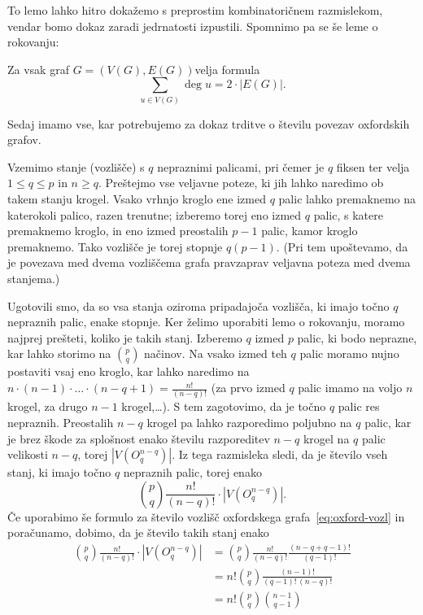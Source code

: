 \documentclass[twoside,11pt]{article}
\newcommand{\graf}[1][G]{\ensuremath{#1 = (V(#1), E(#1))}}
\DeclareMathOperator {\stopnja} {deg}
\begin{document}
To lemo lahko hitro dokažemo s preprostim kombinatoričnem razmislekom, vendar bomo dokaz zaradi jedrnatosti izpustili. Spomnimo pa se še leme o rokovanju:
\begin{lema}
    \label{lema:rokovanje}
    Za vsak graf \graf velja formula
    \begin{equation}
    \sum_{u \in V(G)}\! \stopnja u = 2 \cdot |E(G)|.
    \label{eq:lema-o-rokovanju}
    \end{equation}
\end{lema}

Sedaj imamo vse, kar potrebujemo za dokaz trditve o številu povezav oxfordskih grafov.

\begin{dokaz}
Vzemimo stanje (vozlišče) s $q$ nepraznimi palicami, pri čemer je $q$ fiksen ter velja $1 \leq q \leq p$ in $n \geq q$. Preštejmo vse veljavne poteze, ki jih lahko naredimo ob takem stanju krogel. Vsako vrhnjo kroglo ene izmed $q$ palic lahko premaknemo na katerokoli palico, razen trenutne; izberemo torej eno izmed $q$ palic, s katere premaknemo kroglo, in eno izmed preostalih $p-1$ palic, kamor kroglo premaknemo. Tako vozlišče je torej stopnje $q(p-1)$. (Pri tem upoštevamo, da je povezava med dvema vozliščema grafa pravzaprav veljavna poteza med dvema stanjema.)

Ugotovili smo, da so vsa stanja oziroma pripadajoča vozlišča, ki imajo točno $q$ nepraznih palic, enake stopnje. Ker želimo uporabiti lemo o rokovanju, moramo najprej prešteti, koliko je takih stanj. 
Izberemo $q$ izmed $p$ palic, ki bodo neprazne, kar lahko storimo na ${p \choose q}$ načinov. Na vsako izmed teh $q$ palic moramo nujno postaviti vsaj eno kroglo, kar lahko naredimo na $n \cdot (n-1) \cdot \ldots \cdot (n-q+1) = \frac{n!}{(n-q)!}$ (za prvo izmed $q$ palic imamo na voljo $n$ krogel, za drugo $n-1$ krogel,\ldots). S tem zagotovimo, da je točno $q$ palic res nepraznih. Preostalih $n-q$ krogel pa lahko razporedimo poljubno na $q$ palic, kar je brez škode za splošnost enako številu razporeditev $n-q$ krogel na $q$ palic velikosti $n-q$, torej $|V(O^{n-q}_q)|$.
Iz tega razmisleka sledi, da je število vseh stanj, ki imajo točno $q$ nepraznih palic, torej enako
\[{p \choose q} \frac{n!}{(n-q)!} \cdot |V(O^{n-q}_q)|.\]
Če uporabimo še formulo za število vozlišč oxfordskega grafa~\eqref{eq:oxford-vozl} in poračunamo, dobimo, da je število takih stanj enako
\begin{align*}
{p \choose q} \frac{n!}{(n-q)!} \cdot |V(O^{n-q}_q)| &=
{p \choose q} \frac{n!}{(n-q)!} \frac{(n-q+q-1)!}{(q-1)!} \\ &= n! {p \choose q} \frac{(n-1)!}{(q-1)!\,(n-q)!} \\ &=
n! {p \choose q} {n-1 \choose q-1}
\end{align*}


\end{dokaz}
\end{document}
